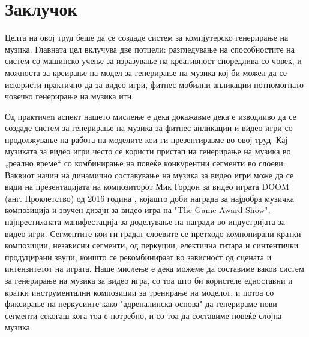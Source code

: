 \chapter{Заклучок}
\label{ch:zaklucok}

Целта на овој труд беше да се создаде систем за компјутерско генерирање на музика. Главната цел вклучува две потцели: разгледување на способностите на систем со машинско учење за изразување на креативност споредлива со човек, и можноста за креирање на модел за генерирање на музика кој би можел да се искористи практично да за видео игри, фитнес мобилни апликации потпомогнато човечко генерирање на музика итн. 

Од практичen аспект нашето мислење е дека докажавме дека е изводливо да се создаде систем за генерирање на музика за фитнес апликации и видео игри со продолжување на работа на моделите кои ги презентиравме во овој труд. Кај музиката за видео игри често се користи пристап на генерирање на музика во „реално време“ со комбинирање на повеќе конкурентни сегменти во слоеви. Ваквиот начин на динамично составување на музика за видео игри може да се види на презентацијата на композиторот Мик Гордон за видео играта DOOM (анг. Проклетство) од 2016 година \cite{Gordon2017}, којашто доби награда за најдобра музичка композиција и звучен дизајн за видео игра на "The Game Award Show", најпрестижната манифестација за доделување на награди во индустријата за видео игри. Сегментите кои ги градат слоевите се претходо компонирани кратки композиции, независни сегменти, од перкуции, електична гитара и синтентички продуцирани звуци, коишто се рекомбинираат во зависност од сцената и интензитетот на играта. Наше мислење е дека можеме да составиме ваков систем за генерирање на музика за видео игра, со тоа што би користеле едноставни и кратки инструментални композиции за тренирање на моделот, и потоа со фиксирање на перкусиите како "адреналинска основа" да генерираме нови сегменти секогаш кога тоа е потребно, и со тоа да составиме повеќе слојна музика. 

